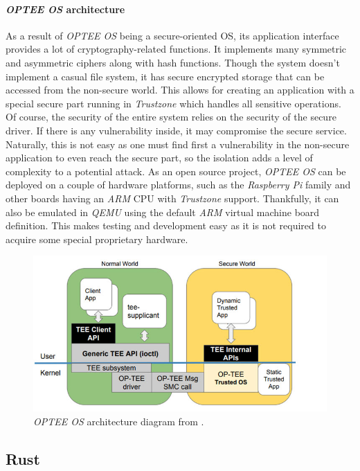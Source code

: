 \paragraph{\textit{OPTEE OS} architecture}
As a result of \textit{OPTEE OS} being a secure-oriented OS, its application interface provides a lot of cryptography-related functions. It implements many symmetric and asymmetric ciphers along with hash functions. Though the system doesn't implement a casual file system, it has secure encrypted storage that can be accessed from the non-secure world. This allows for creating an application with a special secure part running in \textit{Trustzone} which handles all sensitive operations. Of course, the security of the entire system relies on the security of the secure driver. If there is any vulnerability inside, it may compromise the secure service. Naturally, this is not easy as one must find first a vulnerability in the non-secure application to even reach the secure part, so the isolation adds a level of complexity to a potential attack. As an open source project, \textit{OPTEE OS} can be deployed on a couple of hardware platforms, such as the \textit{Raspberry Pi} family and other boards having an \textit{ARM} CPU with \textit{Trustzone} support. Thankfully, it can also be emulated in \textit{QEMU} using the default \textit{ARM} virtual machine board definition. This makes testing and development easy as it is not required to acquire some special proprietary hardware.

\begin{figure}[h!]
    \centering
    \includegraphics[width=.8\linewidth]{tex/img/op-tee-software-architecture.jpg}
    \caption{\textit{OPTEE OS} architecture diagram from \cite{opteeblog}.}
    \label{fig:optee}
\end{figure}


\subsection{Rust}

